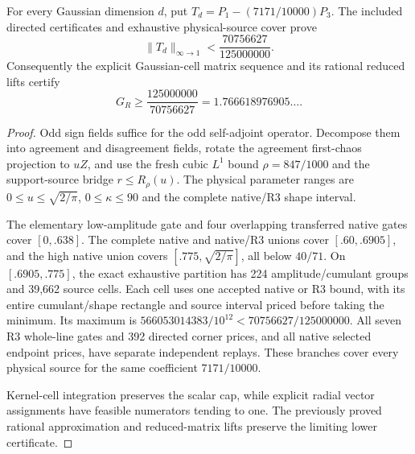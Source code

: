 \begin{proposition}
For every Gaussian dimension $d$, put $T_d=P_1-(7171/10000)P_3$. The included directed certificates and exhaustive physical-source cover prove
\[
 \|T_d\|_{\infty\to1}<\frac{70756627}{125000000}.
\]
Consequently the explicit Gaussian-cell matrix sequence and its rational reduced lifts certify
\[
 G_R\ge\frac{125000000}{70756627}=1.766618976905\ldots.
\]
\end{proposition}
\begin{proof}
Odd sign fields suffice for the odd self-adjoint operator. Decompose them into agreement and disagreement fields, rotate the agreement first-chaos projection to $uZ$, and use the fresh cubic $L^1$ bound $\rho=847/1000$ and the support-source bridge $r\le R_\rho(u)$. The physical parameter ranges are $0\le u\le\sqrt{2/\pi}$, $0\le\kappa\le90$ and the complete native/R3 shape interval.

The elementary low-amplitude gate and four overlapping transferred native gates cover $[0,.638]$. The complete native and native/R3 unions cover $[.60,.6905]$, and the high native union covers $[.775,\sqrt{2/\pi}]$, all below $40/71$. On $[.6905,.775]$, the exact exhaustive partition has 224 amplitude/cumulant groups and 39,662 source cells. Each cell uses one accepted native or R3 bound, with its entire cumulant/shape rectangle and source interval priced before taking the minimum. Its maximum is $566053014383/10^{12}<70756627/125000000$. All seven R3 whole-line gates and 392 directed corner prices, and all native selected endpoint prices, have separate independent replays. These branches cover every physical source for the same coefficient $7171/10000$.

Kernel-cell integration preserves the scalar cap, while explicit radial vector assignments have feasible numerators tending to one. The previously proved rational approximation and reduced-matrix lifts preserve the limiting lower certificate.
\end{proof}
